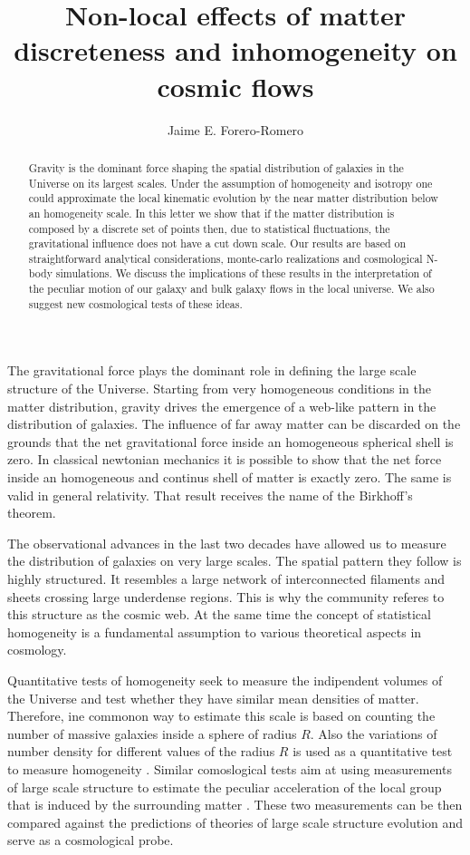 \documentclass{article}
\title{Non-local effects of matter discreteness and inhomogeneity on
  cosmic flows}  \author{Jaime E. Forero-Romero}
\begin{document}
\maketitle
\begin{abstract}

Gravity is the dominant force shaping the spatial distribution of galaxies in
the Universe on its largest scales. Under the assumption of
homogeneity and isotropy one could approximate the local
kinematic evolution by the near matter distribution below an
homogeneity scale. In this letter we show that if the matter
distribution is composed by a discrete set of points then, due to
statistical fluctuations, the gravitational influence does not have a
cut down scale. Our results are based on straightforward
analytical considerations, monte-carlo realizations and cosmological
N-body simulations. We discuss the implications of these results in
the interpretation of the peculiar motion of our galaxy and bulk
galaxy flows in the local universe. We also suggest new cosmological
tests of these ideas. 



\end{abstract}

The gravitational force plays the dominant role in
defining the large scale structure of the Universe. Starting from very
homogeneous conditions in the matter distribution, gravity drives the emergence
of a web-like pattern in the distribution of galaxies. The influence of
far away matter can be discarded on the grounds that the net
gravitational force inside an homogeneous spherical shell is zero. In
classical newtonian mechanics it is possible to show that the net
force inside an homogeneous and continus shell of matter is exactly
zero. The same is valid in general relativity. That result receives
the name of the Birkhoff's theorem.  

The observational advances in the last two decades have allowed us
to measure the distribution of galaxies on very large scales. The
spatial pattern they follow is highly structured. It resembles a
large network of interconnected filaments and sheets crossing large
underdense regions.  This is why the community referes to this
structure as the cosmic web. At the same time the concept of
statistical homogeneity is a fundamental assumption to various
theoretical aspects in cosmology. 

Quantitative tests of homogeneity seek to measure the indipendent
volumes of the Universe and test whether they have similar mean
densities of matter. Therefore, ine commonon way to estimate this
scale is based on counting the number of massive galaxies inside a
sphere of radius $R$. Also the variations of number density for
different values of the radius $R$ is used as a quantitative test to
measure homogeneity \cite{Hogg2005}. 
Similar comoslogical tests aim at using measurements of large scale
structure to estimate the peculiar acceleration of the local group
that is induced by the surrounding matter
\cite{Gibelyou2012,Bilicki2012}. These two measurements can be then
compared against the predictions of theories of large scale structure
evolution and serve as a cosmological probe. 
\end{document}
